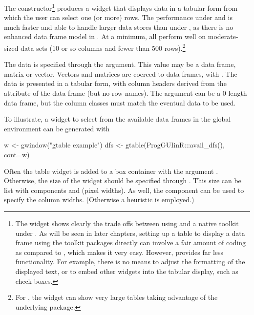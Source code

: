 The  constructor\footnote{The
   widget shows clearly the trade offs between
  using  and a native toolkit under \R. As will be seen
  in later chapters, setting up a table to display a data frame using
  the toolkit packages directly can involve a fair amount of coding as
  compared to , which makes it very easy. However,
   provides far less functionality. For example, there
  is no means to adjust the formatting of the displayed text, or to
  embed other widgets into the tabular display, such as check boxes.
} produces a widget that displays data in a tabular form from which
the user can select one (or more) rows. The performance under
 and  is much faster and able to
handle larger data stores
than under , as there is no enhanced data frame model in
\tcltk. At a minimum, all perform well on moderate-sized data sets (10
or so columns and fewer than 500 rows).\footnote{For
  , the  widget can show very
  large tables taking advantage of the underlying 
  package.}


The data is specified through the 
argument. This value may be a data frame, matrix or vector. Vectors and
matrices are coerced to data frames, with
.  The data is presented in a tabular
form, with column headers derived from the  attribute of
the data frame (but no row names). The 
argument can be a $0$-length data frame, but the column classes must
match the eventual data to be used.


To illustrate, a widget to select from the available data frames in
the global environment can be generated with
\begin{Schunk}
\begin{Sinput}
 w <- gwindow("gtable example")
 dfs <- gtable(ProgGUIinR:::avail_dfs(), cont=w)
\end{Sinput}
\end{Schunk}

Often the table widget is added to a box container with the argument
. Otherwise, the size of the widget should be specified
through . This size can be list with components 
and  (pixel widths). As well, the component
 can be used to specify the column
widths. (Otherwise a heuristic is employed.)

